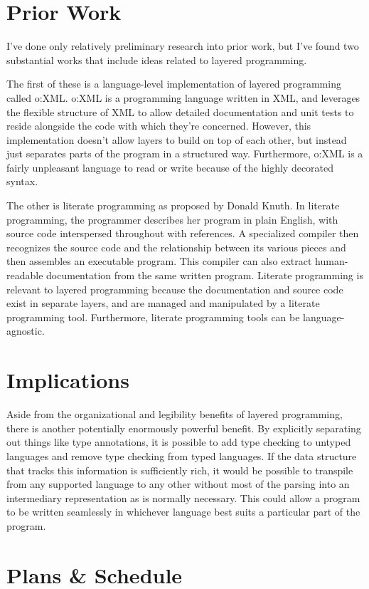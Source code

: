 \documentclass[12pt]{article}
\begin{document}
\section*{Prior Work}
\label{sec:orgheadline2}
I've done only relatively preliminary research into prior work, but I've found two substantial works that include ideas related to layered programming.

The first of these is a language-level implementation of layered programming called o:XML. o:XML is a programming language written in XML, and leverages the flexible structure of XML to allow detailed documentation and unit tests to reside alongside the code with which they're concerned. However, this implementation doesn't allow layers to build on top of each other, but instead just separates parts of the program in a structured way. Furthermore, o:XML is a fairly unpleasant language to read or write because of the highly decorated syntax.

The other is literate programming as proposed by Donald Knuth. In literate programming, the programmer describes her program in plain English, with source code interspersed throughout with references. A specialized compiler then recognizes the source code and the relationship between its various pieces and then assembles an executable program. This compiler can also extract human-readable documentation from the same written program. Literate programming is relevant to layered programming because the documentation and source code exist in separate layers, and are managed and manipulated by a literate programming tool. Furthermore, literate programming tools can be language-agnostic.
\section*{Implications}
\label{sec:orgheadline3}
Aside from the organizational and legibility benefits of layered programming, there is another potentially enormously powerful benefit. By explicitly separating out things like type annotations, it is possible to add type checking to untyped languages and remove type checking from typed languages. If the data structure that tracks this information is sufficiently rich, it would be possible to transpile from any supported language to any other without most of the parsing into an intermediary representation as is normally necessary. This could allow a program to be written seamlessly in whichever language best suits a particular part of the program.
\section*{Plans \& Schedule}
\label{sec:orgheadline8}
\end{document}
